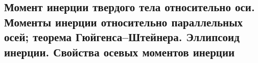 

\subsection{Момент инерции твердого тела относительно оси. Моменты инерции относительно параллельных осей; теорема Гюйгенса–Штейнера. Эллипсоид инерции. Свойства осевых моментов инерции}



